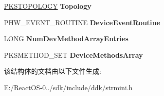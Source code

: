 \begin{DoxyCompactItemize}
\hyperlink{struct_k_s_t_o_p_o_l_o_g_y}{P\+K\+S\+T\+O\+P\+O\+L\+O\+GY} {\bfseries Topology}
\item 
\mbox{\label{struct___h_w___s_t_r_e_a_m___h_e_a_d_e_r_a82c1769a9dbd4e476f1b11e5af76f267}} 
P\+H\+W\+\_\+\+E\+V\+E\+N\+T\+\_\+\+R\+O\+U\+T\+I\+NE {\bfseries Device\+Event\+Routine}
\item 
\mbox{\label{struct___h_w___s_t_r_e_a_m___h_e_a_d_e_r_ab1f1d40b22dc2b7f995aac0e97cd5490}} 
L\+O\+NG {\bfseries Num\+Dev\+Method\+Array\+Entries}
\item 
\mbox{\label{struct___h_w___s_t_r_e_a_m___h_e_a_d_e_r_a7acfeba9605081977176d8e4416e47fd}} 
P\+K\+S\+M\+E\+T\+H\+O\+D\+\_\+\+S\+ET {\bfseries Device\+Methods\+Array}
\end{DoxyCompactItemize}


该结构体的文档由以下文件生成\+:\begin{DoxyCompactItemize}
\item 
E\+:/\+React\+O\+S-\/0../sdk/include/ddk/strmini.\+h\end{DoxyCompactItemize}
